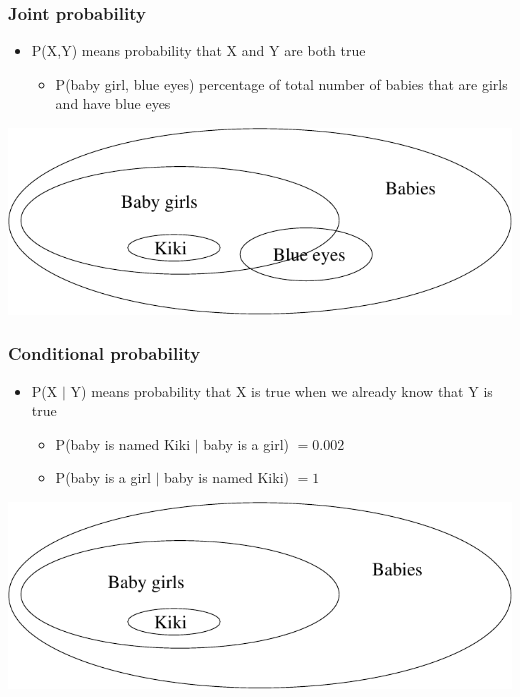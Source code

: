 \documentclass[handout]{beamer}
\begin{document}
\begin{frame}
\frametitle{Joint probability}
\begin{itemize}[<+->]
\item P(X,Y) means probability that X and Y are both true
\begin{itemize}[<+->]
\item P(baby girl, blue eyes)
percentage of total number of babies that are girls and have blue eyes
\end{itemize}
\end{itemize}
\includegraphics[scale=.8]{figures/prob-fig2}

\end{frame}

\begin{frame}
\frametitle{Conditional probability}
\begin{itemize}[<+->]
\item P(X $\mid$ Y) means probability that X is true when we already know
  that Y is true
\begin{itemize}[<+->]
\item P(baby is named Kiki $\mid$ baby is a girl) $= 0.002$
\item P(baby is a girl $\mid$ baby is named Kiki) $= 1$
\end{itemize}
\end{itemize}
\includegraphics[scale=.8]{figures/prob-fig1}

\end{frame}
\end{document}

